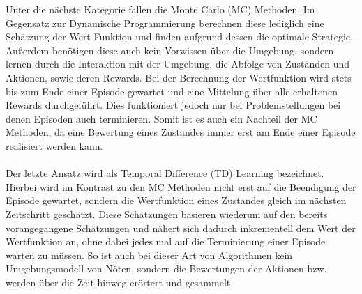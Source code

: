 Unter die nächste Kategorie fallen die Monte Carlo (MC) Methoden. 
Im Gegensatz zur Dynamische Programmierung berechnen diese lediglich eine Schätzung der Wert-Funktion und finden aufgrund dessen die optimale Strategie. Außerdem benötigen diese auch kein Vorwissen über die Umgebung, sondern lernen durch die Interaktion mit der Umgebung, die Abfolge von Zuständen und Aktionen, sowie deren Rewards. Bei der Berechnung der Wertfunktion wird stets bis zum Ende einer Episode gewartet und eine Mittelung über alle erhaltenen Rewards durchgeführt. Dies funktioniert jedoch nur bei Problemstellungen bei denen Episoden auch terminieren. Somit ist es auch ein Nachteil der MC Methoden, da eine Bewertung eines Zustandes immer erst am Ende einer Episode realisiert werden kann.\\\\
Der letzte Ansatz wird als Temporal Difference (TD) Learning bezeichnet. 
Hierbei wird im Kontrast zu den MC Methoden nicht erst auf die Beendigung der Episode gewartet, sondern die Wertfunktion eines Zustandes gleich im nächsten Zeitschritt geschätzt. Diese Schätzungen basieren wiederum auf den bereits vorangegangene Schätzungen und nähert sich dadurch inkrementell dem  Wert der Wertfunktion an, ohne dabei jedes mal auf die Terminierung einer Episode warten zu müssen. So ist auch bei dieser Art von Algorithmen kein Umgebungsmodell von Nöten, sondern die Bewertungen der Aktionen bzw. werden über die Zeit hinweg erörtert und gesammelt.

